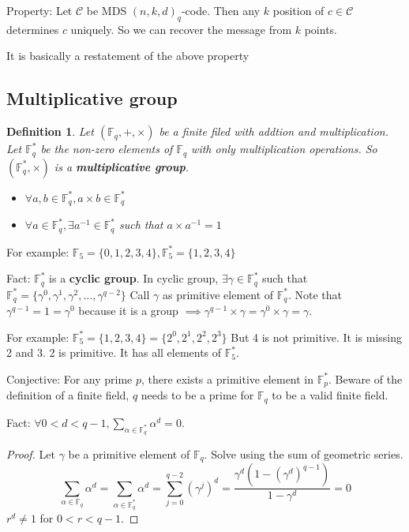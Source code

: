 \documentclass[letterpaper,12pt]{article}
\newtheorem{definition}{Definition}
\begin{document}
Property: Let $\mathcal{C}$ be MDS $(n,k,d)_q$-code. Then any $k$ position of
$c\in\mathcal{C}$ determines $c$ uniquely. So we can recover the message from
$k$ points.

It is basically a restatement of the above property

\subsection{Multiplicative group}
\begin{definition}
    Let $(\mathbb{F}_q,+,\times)$ be a finite filed with addtion and multiplication.
    Let $\mathbb{F}_q^*$ be the non-zero elements of $\mathbb{F}_q$ with only multiplication operations.
    So $(\mathbb{F}_q^*,\times)$ is a \textbf{multiplicative group}.
    \begin{itemize}
        \item $\forall a,b \in \mathbb{F}_q^*, a\times b\in \mathbb{F}_q^*$
        \item $\forall a\in \mathbb{F}_q^*, \exists a^{-1}\in \mathbb{F}_q^*$ such that $a\times a^{-1}=1$
    \end{itemize}
\end{definition}
For example: $\mathbb{F}_5 = \{0,1,2,3,4\}, \mathbb{F}_5^*=\{1,2,3,4\}$

Fact: $\mathbb{F}_q^*$ is a \textbf{cyclic group}. In cyclic group, $\exists
    \gamma \in \mathbb{F}_q^*$ such that
$\mathbb{F}_q^*=\{\gamma^0,\gamma^1,\gamma^2,\ldots,\gamma^{q-2}\}$ Call
$\gamma$ as primitive element of $\mathbb{F}_q^*$. Note that $\gamma
    ^{q-1}=1=\gamma^0$ because it is a group $\implies \gamma^{q-1}\times \gamma =
    \gamma^0\times \gamma = \gamma$.

For example: $\mathbb{F}_5^*=\{1,2,3,4\}=\{2^0,2^1,2^2,2^3\}$ But 4 is not
primitive. It is missing 2 and 3. 2 is primitive. It has all elements of
$\mathbb{F}_5^*$.

Conjective: For any prime $p$, there exists a primitive element in
$\mathbb{F}_p^*$. Beware of the definition of a finite field, $q$ needs to be a
prime for $\mathbb{F}_q$ to be a valid finite field.

Fact: $\forall 0<d<q-1, \sum_{\alpha\in \mathbb{F}_q^*}\alpha^d=0$.
\begin{proof}
    Let $\gamma$ be a primitive element of $\mathbb{F}_q$. Solve using the sum of geometric series.
    \[
        \sum_{\alpha\in \mathbb{F}_q}\alpha^d = \sum_{\alpha\in \mathbb{F}_q^*}\alpha^d = \sum_{j=0}^{q-2}(\gamma^j)^d = \frac{\gamma^d(1-(\gamma^d)^{q-1})}{1-\gamma^d}=0
    \]
    $r^d\neq 1$ for $0<r<q-1$.
\end{proof}
\end{document}
